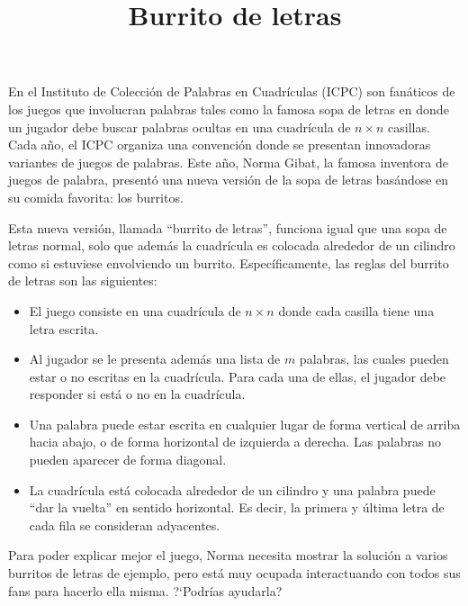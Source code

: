 \documentclass{oci}
\title{Burrito de letras}
\begin{document}
\begin{problemDescription}
  En el Instituto de Colección de Palabras en Cuadrículas (ICPC) son fanáticos
  de los juegos que involucran palabras tales como la famosa sopa de letras
  en donde un jugador debe buscar palabras ocultas en una cuadrícula de $n \times n$
  casillas.
  Cada año, el ICPC organiza una convención donde se presentan
  innovadoras variantes de juegos de palabras.
  Este año, Norma Gibat, la famosa inventora de juegos de palabra,
  presentó una nueva versión de la sopa de letras basándose en su
  comida favorita: los burritos.

  Esta nueva versión, llamada ``burrito de letras'', funciona igual
  que una sopa de letras normal, solo que además la cuadrícula es
  colocada alrededor de un cilindro como si estuviese envolviendo
  un burrito.
  Específicamente, las reglas del burrito de letras son las siguientes:
  \begin{itemize}
    \item El juego consiste en una cuadrícula de $n \times n$ donde cada casilla tiene una letra
      escrita.
    \item Al jugador se le presenta además una lista de $m$ palabras, las cuales
      pueden estar o no escritas en la cuadrícula.
      Para cada una de ellas, el jugador debe responder
      si está o no en la cuadrícula.
    \item Una palabra puede estar escrita en cualquier lugar de forma vertical de arriba hacia abajo,
      o de forma horizontal de izquierda a derecha.
      Las palabras no pueden aparecer de forma diagonal.
    \item La cuadrícula está colocada alrededor de un cilindro y una palabra puede
      ``dar la vuelta'' en sentido horizontal.
      Es decir, la primera y última letra de cada fila se consideran adyacentes.
  \end{itemize}

  Para poder explicar mejor el juego, Norma necesita mostrar la
  solución a varios burritos de letras de ejemplo, pero está muy
  ocupada interactuando con todos sus fans para hacerlo ella misma.
  ?`Podrías ayudarla?


\end{problemDescription}
\end{document}
